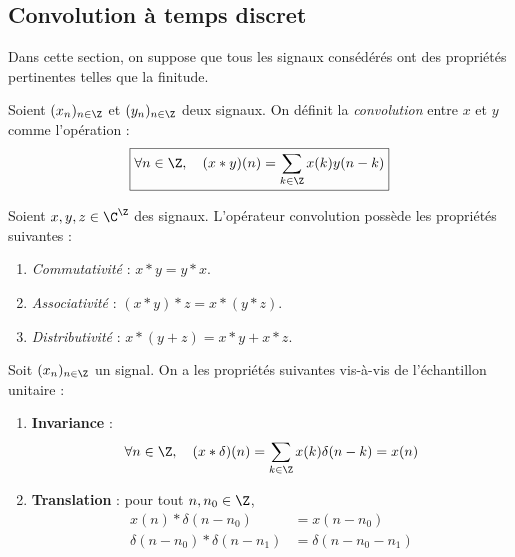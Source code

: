 \subsection{Convolution à temps discret}

Dans cette section, on suppose que tous les signaux consédérés ont des propriétés pertinentes telles 
que la finitude. 

\begin{definition}[Convolution]
    Soient $(x_n)_{n \in \Z}$ et $ (y_n)_{n \in \Z}$ deux signaux. On définit 
    la \emph{convolution} entre $x$ et $y$ comme l'opération : 
        \begin{equation}
            \boxed{\forall n \in \Z, \quad (x * y)(n) = \sum_{k \in \Z} x(k) y(n - k)}
        \end{equation}
\end{definition}

\begin{prop}
    Soient $x, y, z \in \C^\Z$ des signaux. 
    L'opérateur convolution possède les propriétés suivantes : 
    \begin{enumerate}[label=\roman*)]
        \item \emph{Commutativité} : $ x * y = y * x $. 
        \item \emph{Associativité} : $ (x * y) * z = x * (y * z)$. 
        \item \emph{Distributivité} : $ x * (y + z) = x * y + x * z$. 
    \end{enumerate}
\end{prop}

\begin{prop}
    Soit $ (x_n)_{n \in \Z}$ un signal. On a les propriétés suivantes vis-à-vis de l'échantillon 
    unitaire : 
    \begin{enumerate}[label=\roman*)]
        \item \textbf{Invariance} : 
            \begin{equation}
                \forall n \in \Z, \quad (x * \delta)(n) = \sum_{k \in \Z} x(k) \delta( n -k ) = x(n) 
            \end{equation}
        \item \textbf{Translation} : pour tout $n, n_0 \in \Z$, 
            \begin{align*}
                x(n) * \delta(n - n_0) &= x(n - n_0) \\ 
                \delta(n - n_0) * \delta(n - n_1) &= \delta(n - n_0 - n_1)
            \end{align*}
    \end{enumerate}
\end{prop}

